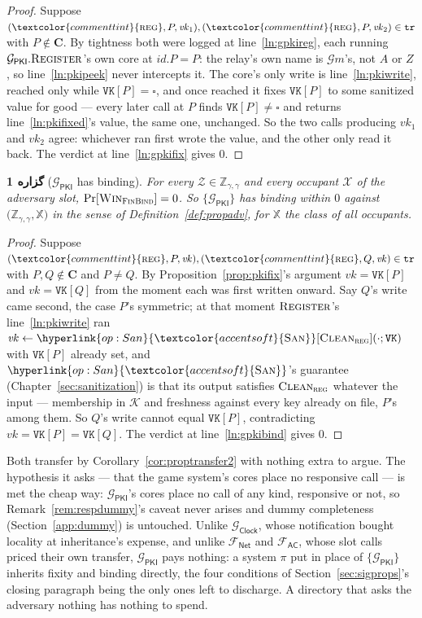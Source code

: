 \documentclass[10pt,oneside,openany]{book}
\newcommand{\Cs}{\mathbf{C}}
\newcommand{\Zenv}{\mathcal{Z}}
\newcommand{\ZenvSet}{\mathbb{Z}}
\newcommand{\op}[1]{\textnormal{\textsc{#1}}}
\newcommand{\opl}[1]{\hyperlink{op:#1}{\textcolor{accentsoft}{\op{#1}}}}
\newcommand{\id}{id}
\newcommand{\atom}[1]{\textcolor{commenttint}{\op{#1}}}
\newcommand{\Gm}{\mathcal{G}m}
\newcommand{\Xset}{\mathbb{X}}
\newcommand{\Win}{\op{Win}}
\newcommand{\Gclock}{\mathcal{G}_{\mathsf{Clock}}}
\newcommand{\Gpki}{\mathcal{G}_{\mathsf{PKI}}}
\newcommand{\Fnet}{\mathcal{F}_{\mathsf{Net}}}
\newcommand{\Fac}{\mathcal{F}_{\mathsf{AC}}}
\newcommand{\vk}{\mathit{vk}}
\newcommand{\unset}{\square}
\newcommand{\Keys}{\mathcal{K}}
\newcommand{\San}{\opl{San}}
\newcommand{\Clean}{\op{Clean}}
\newcommand{\V}[1]{\mathtt{#1}}
\theoremstyle{accentdef}
\theoremstyle{accentplain}
\newtheorem{proposition}[definition]{گزاره}
\begin{document}
\begin{proof}
Suppose $(\atom{reg},P,\vk_1),(\atom{reg},P,\vk_2) \in \V{tr}$ with $P \notin \Cs$. By tightness both
were logged at line~\ref{ln:gpkireg}, each running $\Gpki.\op{Register}$'s own core at $\id.P = P$:
the relay's own name is $\Gm$'s, not $A$ or $Z$, so line~\ref{ln:pkipeek} never intercepts it. The
core's only write is line~\ref{ln:pkiwrite}, reached only while $\V{VK}[P] = \unset$, and once
reached it fixes $\V{VK}[P]$ to some sanitized value for good --- every later call at $P$ finds
$\V{VK}[P] \neq \unset$ and returns line~\ref{ln:pkifixed}'s value, the same one, unchanged. So the
two calls producing $\vk_1$ and $\vk_2$ agree: whichever ran first wrote the value, and the other
only read it back. The verdict at line~\ref{ln:gpkifix} gives $0$.
\end{proof}

\begin{proposition}[$\Gpki$ has binding]\label{prop:pkibind}
For every $\Zenv \in \ZenvSet_{\gamma,\gamma}$ and every occupant $\mathcal{X}$ of the adversary
slot, $\Pr[\Win_{\op{FinBind}}] = 0$. So $\{\Gpki\}$ has binding within $0$ against
$\bigl(\ZenvSet_{\gamma,\gamma},\Xset\bigr)$ in the sense of Definition~\ref{def:propadv}, for
$\Xset$ the class of all occupants.
\end{proposition}

\begin{proof}
Suppose $(\atom{reg},P,\vk),(\atom{reg},Q,\vk) \in \V{tr}$ with $P,Q \notin \Cs$ and $P \neq Q$. By
Proposition~\ref{prop:pkifix}'s argument $\vk = \V{VK}[P]$ and $\vk = \V{VK}[Q]$ from the moment
each was first written onward. Say $Q$'s write came second, the case $P$'s symmetric; at that
moment $\op{Register}$'s line~\ref{ln:pkiwrite} ran $\vk \gets \San[\Clean_{\op{reg}}](\cdot;\V{VK})$ with $\V{VK}[P]$
already set, and $\San$'s guarantee (Chapter~\ref{sec:sanitization}) is that its output satisfies
$\Clean_{\op{reg}}$ whatever the input --- membership in $\Keys$ and freshness against every key
already on file, $P$'s among them. So $Q$'s write cannot equal $\V{VK}[P]$, contradicting
$\vk = \V{VK}[P] = \V{VK}[Q]$. The verdict at line~\ref{ln:gpkibind} gives $0$.
\end{proof}

Both transfer by Corollary~\ref{cor:proptransfer2} with nothing extra to argue. The hypothesis it
asks --- that the game system's cores place no responsive call --- is met the cheap way: $\Gpki$'s
cores place no call of any kind, responsive or not, so Remark~\ref{rem:respdummy}'s caveat never
arises and dummy completeness (Section~\ref{app:dummy}) is untouched. Unlike $\Gclock$, whose
notification bought locality at inheritance's expense, and unlike $\Fnet$ and $\Fac$, whose slot
calls priced their own transfer, $\Gpki$ pays nothing: a system $\pi$ put in place of $\{\Gpki\}$
inherits fixity and binding directly, the four conditions of Section~\ref{sec:sigprops}'s closing
paragraph being the only ones left to discharge. A directory that asks the adversary nothing has
nothing to spend.
\end{document}
